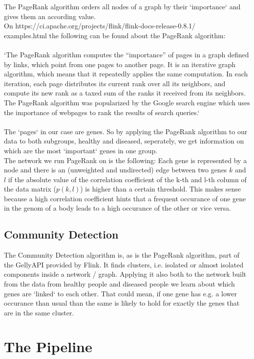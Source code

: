 \documentclass{bioinfo}
\begin{document}
The PageRank algorithm orders all nodes of a graph by their `importance` and gives them an according value.\\
On https://ci.apache.org/projects/flink/flink-docs-release-0.8.1/\\
examples.html the following can be found about the PageRank algorithm:\\\\
`The PageRank algorithm computes the “importance” of pages in a graph defined by links, which point from one pages to another page. It is an iterative graph algorithm, which means that it repeatedly applies the same computation. In each iteration, each page distributes its current rank over all its neighbors, and compute its new rank as a taxed sum of the ranks it received from its neighbors. The PageRank algorithm was popularized by the Google search engine which uses the importance of webpages to rank the results of search queries.`\\\\
The `pages` in our case are genes. So by applying the PageRank algorithm to our data to both subgroups, healthy and diseased, seperately, we get information on which are the most `important` genes in one group.\\
The network we run PageRank on is the following: Each gene is represented by a node and there is an (unweighted and undirected) edge between two genes $k$ and $l$ if the absolute value of the correlation coefficient of the k-th and l-th column of the data matrix ($p(k,l)$) is higher than a certain threshold. This makes sense because a high correlation coefficient hints that a frequent occurance of one gene in the genom of a body leads to a high occurance of the other or vice versa.


\subsection{Community Detection}
The Community Detection algorithm is, as is the PageRank algorithm, part of the GellyAPI provided by Flink. It finds clusters, i.e. isolated or almost isolated components inside a network / graph. Applying it also both to the network built from the data from healthy people and diseased people we learn about which genes are `linked` to each other. That could mean, if one gene has e.g. a lower occurance than usual than the same is likely to hold for exactly the genes that are in the same cluster.
 


\section{The Pipeline}
\end{document}
